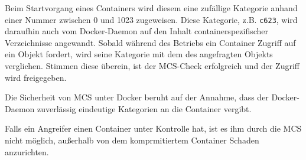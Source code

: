 \documentclass[../main.tex]{subfiles}
\begin{document}
					Beim Startvorgang eines Containers wird diesem eine zufällige Kategorie anhand einer Nummer zwischen 0 und 1023 zugeweisen. Diese Kategorie, z.B. \texttt{c623}, wird daraufhin auch vom Docker-Daemon auf den Inhalt containerspezifischer Verzeichnisse angewandt. Sobald während des Betriebs ein Container Zugriff auf ein Objekt fordert, wird seine Kategorie mit dem des angefragten Objekts verglichen. Stimmen diese überein, ist der MCS-Check erfolgreich und der Zugriff wird freigegeben.

					Die Sicherheit von MCS unter Docker beruht auf der Annahme, dass der Docker-Daemon zuverlässig eindeutige Kategorien an die Container vergibt.

					Falls ein Angreifer einen Container unter Kontrolle hat, ist es ihm durch die MCS nicht möglich, außerhalb von dem komprmitiertem Container Schaden anzurichten.



\end{document}
